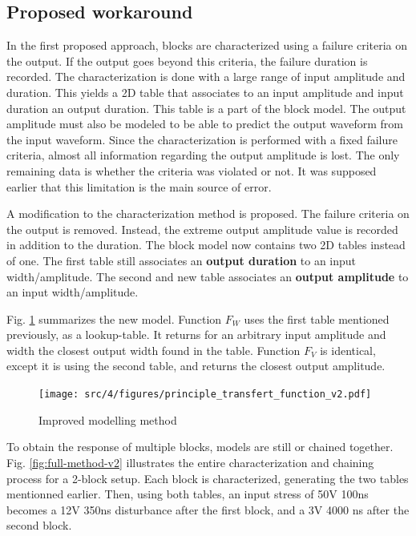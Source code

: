 \subsection{Proposed workaround}

%
In the first proposed approach, blocks are characterized using a failure criteria on the output.
If the output goes beyond this criteria, the failure duration is recorded.
The characterization is done with a large range of input amplitude and duration.
This yields a 2D table that associates to an input amplitude and input duration an output duration.
This table is a part of the block model.
The output amplitude must also be modeled to be able to predict the output waveform from the input waveform.
Since the characterization is performed with a fixed failure criteria, almost all information regarding the output amplitude is lost.
The only remaining data is whether the criteria was violated or not.
It was supposed earlier that this limitation is the main source of error.

A modification to the characterization method is proposed.
The failure criteria on the output is removed.
Instead, the extreme output amplitude value is recorded in addition to the duration.
The block model now contains two 2D tables instead of one.
The first table still associates an \textbf{output duration} to an input width/amplitude.
The second and new table associates an \textbf{output amplitude} to an input width/amplitude.

Fig. \ref{fig:principle-transfert-func-v2} summarizes the new model.
Function $F_{W}$ uses the first table mentioned previously, as a \gls{lookup-table}.
It returns for an arbitrary input amplitude and width the closest output width found in the table.
Function $F_{V}$ is identical, except it is using the second table, and returns the closest output amplitude.

\begin{figure}[!h]
  \centering
  \texttt{[image: src/4/figures/principle\_transfert\_function\_v2.pdf]}
  \caption{Improved modelling method}
  \label{fig:principle-transfert-func-v2}
\end{figure}

To obtain the response of multiple blocks, models are still or chained together.
Fig. \ref{fig:full-method-v2} illustrates the entire characterization and chaining process for a 2-block setup.
Each block is characterized, generating the two tables mentionned earlier.
Then, using both tables, an input stress of 50V 100ns becomes a 12V 350ns disturbance after the first block, and a 3V 4000 ns after the second block.


